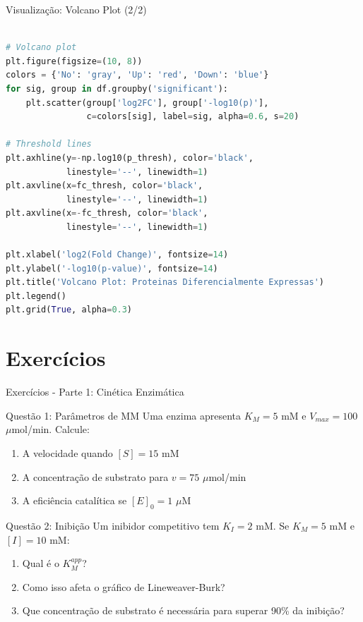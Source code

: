 \begin{frame}[fragile, shrink=15]{Visualização: Volcano Plot (2/2)}
\begin{lstlisting}[language=Python, caption=Volcano plot proteômico, basicstyle=\ttfamily\tiny]

# Volcano plot
plt.figure(figsize=(10, 8))
colors = {'No': 'gray', 'Up': 'red', 'Down': 'blue'}
for sig, group in df.groupby('significant'):
    plt.scatter(group['log2FC'], group['-log10(p)'],
                c=colors[sig], label=sig, alpha=0.6, s=20)

# Threshold lines
plt.axhline(y=-np.log10(p_thresh), color='black',
            linestyle='--', linewidth=1)
plt.axvline(x=fc_thresh, color='black',
            linestyle='--', linewidth=1)
plt.axvline(x=-fc_thresh, color='black',
            linestyle='--', linewidth=1)

plt.xlabel('log2(Fold Change)', fontsize=14)
plt.ylabel('-log10(p-value)', fontsize=14)
plt.title('Volcano Plot: Proteinas Diferencialmente Expressas')
plt.legend()
plt.grid(True, alpha=0.3)
\end{lstlisting}
\end{frame}

\section{Exercícios}

\begin{frame}[allowframebreaks]{Exercícios - Parte 1: Cinética Enzimática}
\begin{block}{Questão 1: Parâmetros de MM}
Uma enzima apresenta $K_M = 5$ mM e $V_{max} = 100$ $\mu$mol/min. Calcule:
\begin{enumerate}
    \item A velocidade quando $[S] = 15$ mM
    \item A concentração de substrato para $v = 75$ $\mu$mol/min
    \item A eficiência catalítica se $[E]_0 = 1$ $\mu$M
\end{enumerate}
\end{block}

\begin{block}{Questão 2: Inibição}
Um inibidor competitivo tem $K_I = 2$ mM. Se $K_M = 5$ mM e $[I] = 10$ mM:
\begin{enumerate}
    \item Qual é o $K_M^{app}$?
    \item Como isso afeta o gráfico de Lineweaver-Burk?
    \item Que concentração de substrato é necessária para superar 90\% da inibição?
\end{enumerate}
\end{block}
\end{frame}

